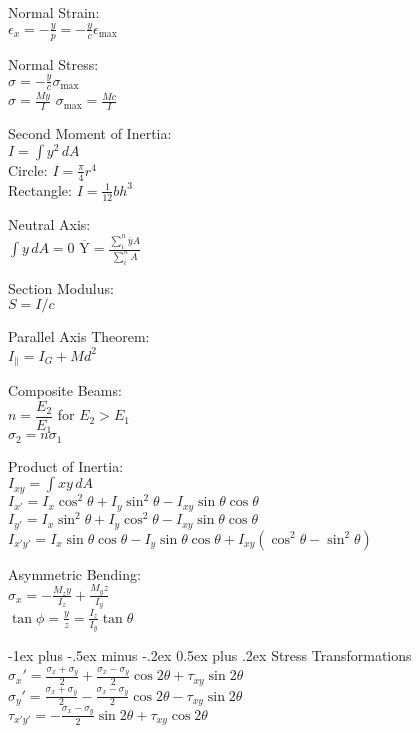 \documentclass[10pt,landscape]{article}
\makeatletter
\renewcommand{\section}{\@startsection{section}{1}{0mm}%
                                {-1ex plus -.5ex minus -.2ex}%
                                {0.5ex plus .2ex}%
                                {\normalfont\large\bfseries}}
\newcommand{\tab}{\hspace{.02\textwidth}}
\newcommand{\ds}{\displaystyle}
\makeatother
\begin{document}
\begin{multicols}{3}
Normal Strain:\\
\vspace{1mm}
\tab $\ds \epsilon_{x} = -\frac{y}{p} = -\frac{y}{c}\epsilon_{\text{max}}$

Normal Stress:\\
\vspace{1mm}
\tab $\ds \sigma = -\frac{y}{c}\sigma_{\text{max}}$\\
\vspace{1mm}
\tab $\ds \sigma = \frac{My}{I}$
\tab $\ds \sigma_{\text{max}} = \frac{Mc}{I}$

Second Moment of Inertia:\\
\tab $I = \int y^2\,dA$\\
\tab Circle: $\ds I = \frac{\pi}{4}r^4$\\
\tab Rectangle: $\ds I = \frac{1}{12}bh^3$

Neutral Axis:\\
\tab $\int y\,dA = 0$
\tab $\overline{\text{Y}}=\frac{\sum_i^n\overline{y}A}{\sum_i^nA}$

Section Modulus:\\
\tab $S = I/c$

Parallel Axis Theorem:\\
\tab $I_{\parallel} = I_G + Md^2$

Composite Beams:\\
\tab $n = \dfrac{E_2}{E_1}$ for $E_2 > E_1$\\
\vspace{1mm}
\tab $\sigma_2 = n \sigma_1$

Product of Inertia:\\
\tab $I_{xy} = \int xy\,dA$\\
\tab $I_{x'} = I_x \cos^2\theta + I_y\sin^2\theta - I_{xy}\sin\theta\cos\theta$\\
\tab $I_{y'} = I_x \sin^2\theta + I_y\cos^2\theta - I_{xy}\sin\theta\cos\theta$\\
\tab $I_{x'y'} = I_x\sin\theta\cos\theta-I_y\sin\theta\cos\theta+I_{xy}(\cos^2\theta-\sin^2\theta)$

Asymmetric Bending:\\
\tab $\ds \sigma_x = -\frac{M_z y}{I_z}+\frac{M_y z}{I_y}$\\
\tab $\ds \tan \phi = \frac{y}{z} = \frac{I_z}{I_y}\tan\theta$

\section{Stress Transformations}
\tab $\ds \sigma_x' = \frac{\sigma_x + \sigma_y}{2}	+ \frac{\sigma_x - \sigma_y}{2}\cos2\theta + \tau_{xy}\sin2\theta$
\\[2mm]
\tab $\ds \sigma_y' = \frac{\sigma_x + \sigma_y}{2}	- \frac{\sigma_x - \sigma_y}{2}\cos2\theta - \tau_{xy}\sin2\theta$
\\[2mm]
\tab $\ds \tau_{x'y'} = -\frac{\sigma_x - \sigma_y}{2}\sin2\theta + \tau_{xy}\cos2\theta$


\end{multicols}
\end{document}
